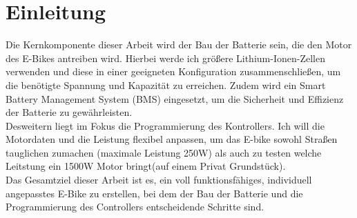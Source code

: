 
\chapter{Einleitung}

Die Kernkomponente dieser Arbeit wird der Bau der Batterie sein, die den Motor des E-Bikes antreiben wird. Hierbei werde ich größere Lithium-Ionen-Zellen verwenden und diese in einer geeigneten Konfiguration zusammenschließen, um die benötigte Spannung und Kapazität zu erreichen. Zudem wird ein Smart Battery Management System (BMS) eingesetzt, um die Sicherheit und Effizienz der Batterie zu gewährleisten.\\

Desweitern liegt im Fokus die Programmierung des Kontrollers. Ich will die Motordaten und die Leistung flexibel anpassen, um das E-bike sowohl Straßen tauglichen zumachen (maximale Leistung 250W) als auch zu testen welche Leitstung ein 1500W Motor bringt(auf einem Privat Grundstück).\\

Das Gesamtziel dieser Arbeit ist es, ein voll funktionsfähiges, individuell angepasstes E-Bike zu erstellen, bei dem der Bau der Batterie und die Programmierung des Controllers entscheidende Schritte sind. \\

